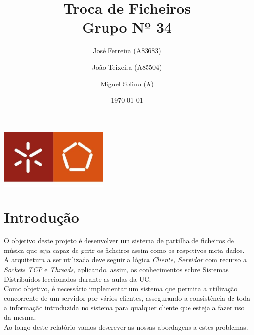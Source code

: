\documentclass[a4paper]{report}
\begin{document}
\title{Troca de Ficheiros\\ 
\large Grupo Nº 34}
\author{José Ferreira (A83683) \and João Teixeira (A85504) \and Miguel Solino (A)}
\date{\today}

\begin{center}
    \begin{minipage}{0.75\linewidth}
        \centering
        \includegraphics[width=0.4\textwidth]{eng.jpeg}\par\vspace{1cm}
        \vspace{1.5cm}
        \href{https://www.uminho.pt/PT}
        {\color{black}{\scshape\LARGE Universidade do Minho}} \par
        \vspace{1cm}
        \href{https://www.di.uminho.pt/}
        {\color{black}{\scshape\Large Departamento de Informática}} \par
        \vspace{1.5cm}
        \maketitle
    \end{minipage}
\end{center}

\tableofcontents

\pagebreak
\chapter{Introdução}
O objetivo deste projeto é desenvolver um sistema de partilha de ficheiros de 
música que seja capaz de gerir os ficheiros assim como os respetivos
meta-dados.\\
A arquitetura a ser utilizada deve seguir a lógica \textit{Cliente, Servidor}
com recurso a \textit{Sockets TCP} e \textit{Threads}, aplicando, assim, os
conhecimentos sobre Sistemas Distribuídos leccionados durante as aulas da UC.\\
Como objetivo, é necessário implementar um sistema que permita a utilização 
concorrente de um servidor por vários clientes, assegurando a consistência
de toda a informação introduzida no sistema para qualquer cliente que esteja
a fazer uso da mesma.\\
Ao longo deste relatório vamos descrever as nossas abordagens a estes problemas.
\end{document}
